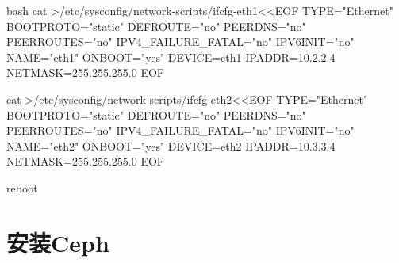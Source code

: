 \begin{outline}[enumerate]
\begin{code-block}{bash}
cat >/etc/sysconfig/network-scripts/ifcfg-eth1<<EOF
TYPE="Ethernet"
BOOTPROTO="static"
DEFROUTE="no"
PEERDNS="no"
PEERROUTES="no"
IPV4_FAILURE_FATAL="no"
IPV6INIT="no"
NAME="eth1"
ONBOOT="yes"
DEVICE=eth1
IPADDR=10.2.2.4
NETMASK=255.255.255.0
EOF

cat >/etc/sysconfig/network-scripts/ifcfg-eth2<<EOF
TYPE="Ethernet"
BOOTPROTO="static"
DEFROUTE="no"
PEERDNS="no"
PEERROUTES="no"
IPV4_FAILURE_FATAL="no"
IPV6INIT="no"
NAME="eth2"
ONBOOT="yes"
DEVICE=eth2
IPADDR=10.3.3.4
NETMASK=255.255.255.0
EOF

reboot
\end{code-block}

\end{outline}

\section{安装Ceph}
\label{section:ceph_configuration}
